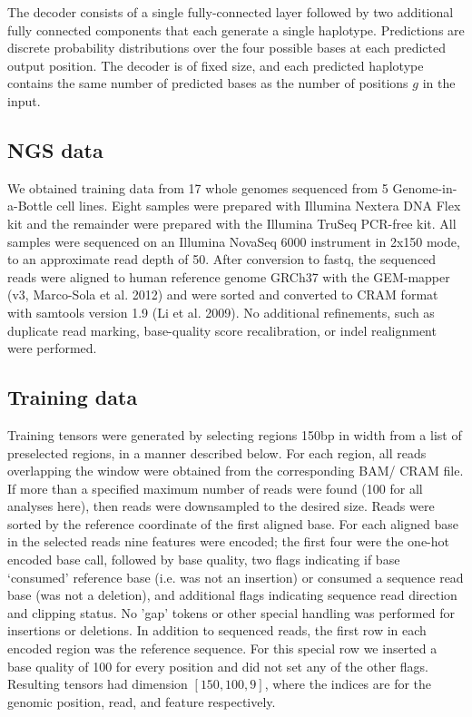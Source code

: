 \documentclass[]{article}
\begin{document}
The decoder consists of a single fully-connected layer followed by two additional fully connected components that each generate a single haplotype. Predictions are discrete probability distributions over the four possible bases at each predicted output position. The decoder is of fixed size, and each predicted haplotype contains the same number of predicted bases as the number of positions $g$ in the input. 


\subsection{NGS data}

We obtained training data from 17 whole genomes sequenced from 5 Genome-in-a-Bottle cell lines. Eight samples were prepared with Illumina Nextera DNA Flex kit and the remainder were prepared with the Illumina TruSeq PCR-free kit. All samples were sequenced on an Illumina NovaSeq 6000 instrument in 2x150 mode, to an approximate read depth of 50. After conversion to fastq, the sequenced reads were aligned to human reference genome GRCh37 with the GEM-mapper (v3, Marco-Sola et al. 2012) and were sorted and converted to CRAM format with samtools version 1.9 (Li et al. 2009). No additional refinements, such as duplicate read marking, base-quality score recalibration, or indel realignment were performed.

\subsection{Training data}

Training tensors were generated by selecting regions 150bp in width from a list of preselected regions, in a manner described below. For each region, all reads overlapping the window were obtained from the corresponding BAM/ CRAM file. If more than a specified maximum number of reads were found (100 for all analyses here), then reads were downsampled to the desired size.  Reads were sorted by the reference coordinate of the first aligned base. For each aligned base in the selected reads nine features were encoded; the first four were the one-hot encoded base call, followed by base quality, two flags indicating if base `consumed' reference base (i.e. was not an insertion) or consumed a sequence read base (was not a deletion), and additional flags indicating sequence read direction and clipping status.  No 'gap' tokens or other special handling was performed for insertions or deletions. In addition to sequenced reads, the first row in each encoded region was the reference sequence. For this special row we inserted a base quality of 100 for every position and did not set any of the other flags. Resulting tensors had dimension $[150, 100, 9]$, where the indices are for the genomic position, read, and feature respectively.  
\end{document}
